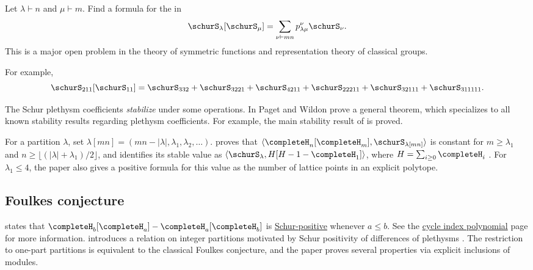 \begin{problem}
Let $\lambda \vdash n$ and $\mu \vdash m$.  Find a formula for the
\label{schurPlethysmCoefficient} in
\[
\schurS_\lambda[\schurS_\mu] = \sum_{\nu \vdash mn} p^{\nu}_{\lambda \mu} \schurS_{\nu}.
\]
This is a major open problem in the theory of symmetric functions and representation theory of classical groups.
\end{problem}

\begin{example}
For example,
\[
\schurS_{211}[\schurS_{11}] =
\schurS_{3 3 2} + \schurS_{3 2 2 1} + \schurS_{4 2 1 1} +
 \schurS_{2 2 2 1 1} + \schurS_{3 2 1 1 1} + \schurS_{3 1 1 1 1 1}.
\]
\end{example}


The Schur plethysm coefficients \emph{stabilize} under some operations.
In \cite{PagetWildon2025} Paget and Wildon prove a general theorem,
which specializes to all known stability results regarding plethysm coefficients.
For example, the main stability result of \cite{LawOkitani2023} is proved.

For a partition $\lambda$, set
$\lambda[mn]=(mn-|\lambda|,\lambda_1,\lambda_2,\dotsc)$.
 proves that
$\langle \completeH_n[\completeH_m],\schurS_{\lambda[mn]}\rangle$ is
constant for $m\geq\lambda_1$ and
$n\geq\lfloor(|\lambda|+\lambda_1)/2\rfloor$, and identifies its stable
value as $\langle \schurS_\lambda,H[H-1-\completeH_1]\rangle$, where
$H=\sum_{i\geq0}\completeH_i$ \cite{Sarkar2026x}.  For
$\lambda_1\leq4$, the paper also gives a positive formula for this value as
the number of lattice points in an explicit polytope.

\subsection[plethysmFoulkesConjecture]{Foulkes conjecture}

\label{foulkesConjecture} \cite{Foulkes1950}
states that $\completeH_b[\completeH_a]-\completeH_a[\completeH_b]$ is
\hyperref[schurPositivity]{Schur-positive} whenever $a \leq b$.
See the \hyperref[cycleIndexPolynomial]{cycle index polynomial} page for more information.
 introduces a relation on integer partitions
motivated by Schur positivity of differences of plethysms
\cite{Tetreault2020PartitionOrder}.  The restriction to one-part partitions is
equivalent to the classical Foulkes conjecture, and the paper proves several
properties via explicit inclusions of modules.

